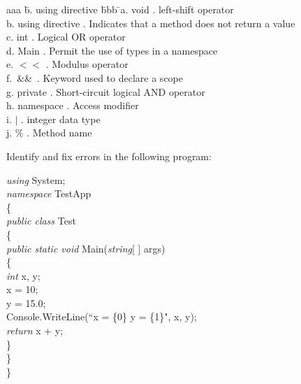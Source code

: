 {\begin{list}{E \thechapter.\theenumi}
\begin{tabbing}
aaa \= b.  using directive \= bbb \= \kill a. \>  void  .  \>
left-shift operator \\
b.  \> using directive  .  \> Indicates that a method does not
return a value \\
c. \>  int  . \>  Logical OR operator \\
d. \>  Main  .  \> Permit the use of types in a namespace \\
e.  \> $<\!<$  . \>  Modulus operator \\
f.  \> \,\&\&\,  .  \> Keyword used to declare a scope \\
g.  \> private  .  \> Short-circuit logical AND operator \\
h.  \> namespace  .  \> Access modifier \\
i.  \> $\vert$  .  \> integer data type \\
j.   \> \%   .  \> Method name
\end{tabbing}



\item Identify and fix errors in the following program:

\emph{using} System; \\
\emph{namespace} TestApp \\
\{\\
\hspace*{0.2in}    \emph{public class} Test\\
\hspace*{0.2in}    \{\\
\hspace*{0.4in}        \emph{public static void} Main(\emph{string}[ ] args)\\
\hspace*{0.4in}        \{\\
\hspace*{0.6in}            \emph{int} x, y;\\
\hspace*{0.6in}            x = 10;\\
\hspace*{0.6in}            y = 15.0;\\
\hspace*{0.6in}            Console.WriteLine(``x = \{0\}  y = \{1\}", x, y);\\
\hspace*{0.6in}            \emph{return} x + y;\\
\hspace*{0.4in}        \}\\
\hspace*{0.2in}    \}\\
\}


\end{list}}

